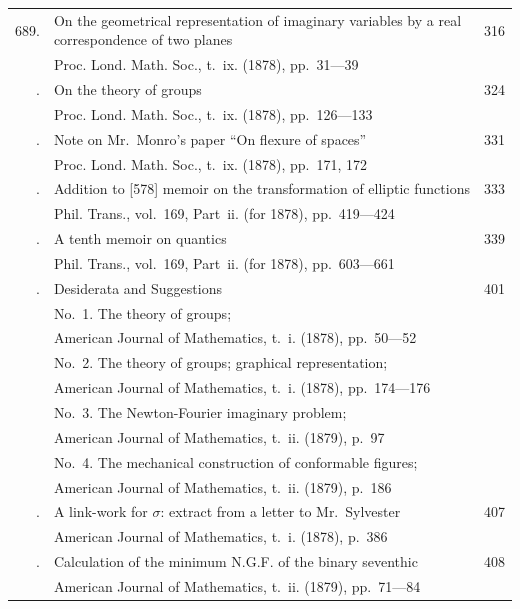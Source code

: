\documentclass[12pt,a4paper]{article}
\theoremstyle{plain}
\theoremstyle{definition}
\theoremstyle{remark}
\begin{document}
\begin{longtable}{rp{4.5in}r}
689. & On the geometrical representation of imaginary variables by a real correspondence of two planes & 316 \\
    & \quad Proc. Lond. Math. Soc., t.~ix. (1878), pp.~31---39 & \\
\addlinespace
690. & On the theory of groups & 324 \\
    & \quad Proc. Lond. Math. Soc., t.~ix. (1878), pp.~126---133 & \\
\addlinespace
691. & Note on Mr.~Monro's paper ``On flexure of spaces'' & 331 \\
    & \quad Proc. Lond. Math. Soc., t.~ix. (1878), pp.~171, 172 & \\
\addlinespace
692. & Addition to [578] memoir on the transformation of elliptic functions & 333 \\
    & \quad Phil. Trans., vol.~169, Part~ii. (for 1878), pp.~419---424 & \\
\addlinespace
693. & A tenth memoir on quantics & 339 \\
    & \quad Phil. Trans., vol.~169, Part~ii. (for 1878), pp.~603---661 & \\
\addlinespace
694. & Desiderata and Suggestions & 401 \\
    & \quad No.~1. The theory of groups; & \\
    & \quad \quad American Journal of Mathematics, t.~i. (1878), pp.~50---52 & \\
    & \quad No.~2. The theory of groups; graphical representation; & \\
    & \quad \quad American Journal of Mathematics, t.~i. (1878), pp.~174---176 & \\
    & \quad No.~3. The Newton-Fourier imaginary problem; & \\
    & \quad \quad American Journal of Mathematics, t.~ii. (1879), p.~97 & \\
    & \quad No.~4. The mechanical construction of conformable figures; & \\
    & \quad \quad American Journal of Mathematics, t.~ii. (1879), p.~186 & \\
\addlinespace
695. & A link-work for $\sigma$: extract from a letter to Mr.~Sylvester & 407 \\
    & \quad American Journal of Mathematics, t.~i. (1878), p.~386 & \\
\addlinespace
696. & Calculation of the minimum N.G.F. of the binary seventhic & 408 \\
    & \quad American Journal of Mathematics, t.~ii. (1879), pp.~71---84 & \\

\end{longtable}
\end{document}
